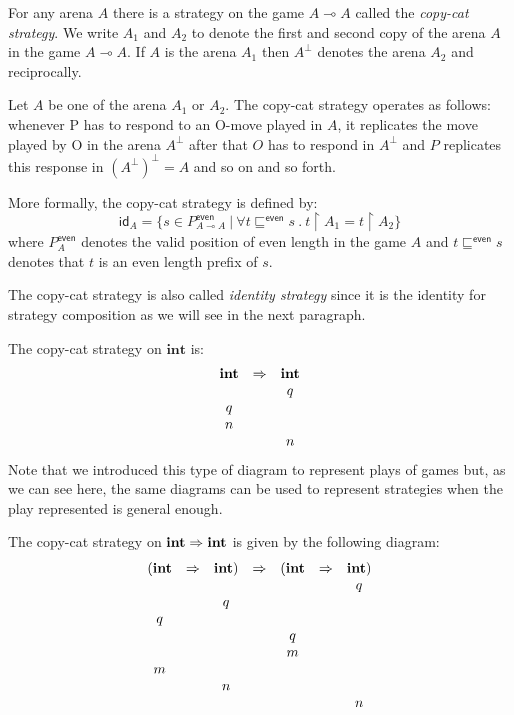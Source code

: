 For any arena $A$ there is a strategy on the game $A \multimap A$
called the \emph{copy-cat strategy}. We write $A_1$ and $A_2$ to
denote the first and second copy of the arena $A$ in the game $A
\multimap A$. If $A$ is the arena $A_1$ then $A^\perp$ denotes the
arena $A_2$ and reciprocally.

Let $A$ be one of the arena $A_1$ or $A_2$. The copy-cat strategy
operates as follows: whenever P has to respond to an O-move played
in $A$, it replicates the move played by O in the arena $A^{\perp}$
after that $O$ has to respond in $A^{\perp}$ and $P$ replicates this
response in $(A^\perp)^\perp = A$ and so on and so forth.


More formally, the copy-cat strategy is defined by:
$$ \textsf{id}_A = \{ s \in P^{\textsf{even}}_{A \multimap A} \ | \ \forall t \sqsubseteq^{\textsf{even}} s\ .\ t \upharpoonright A_1 = t \upharpoonright A_2 \}$$
where $P^{\textsf{even}}_A$ denotes the valid position of even
length in the game $A$ and $t \sqsubseteq^{\textsf{even}} s$ denotes
that $t$ is an even length prefix of $s$.

The copy-cat strategy is also called \emph{identity strategy} since
it is the identity for strategy composition as we will see in the
next paragraph.

\begin{exmp} The copy-cat strategy on $\textbf{int}$ is:
$$\begin{array}{ccc}
\textbf{int} & \Rightarrow & \textbf{int} \\
&& q\\
q \\
n \\
&& n
\end{array}
$$
Note that we introduced this type of diagram to represent plays of
games but, as we can see here, the same diagrams can be used to
represent strategies when the play represented is general enough.

The copy-cat strategy on $\textbf{int} \Rightarrow \textbf{int}$ is given
by the following diagram:
$$\begin{array}{ccccccc}
(\textbf{int} & \Rightarrow & \textbf{int}) & \Rightarrow & (\textbf{int} & \Rightarrow & \textbf{int}) \\
&&&& && q\\
&& q\\
q \\
&&&& q \\
&&&& m \\
m\\
&& n \\
&&&& && n
\end{array}$$
\end{exmp}

